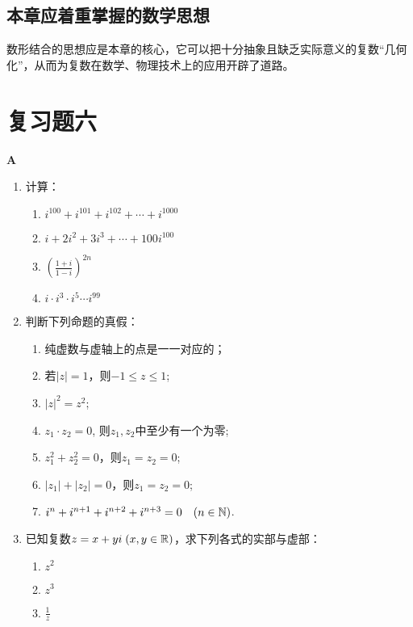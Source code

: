\subsection{本章应着重掌握的数学思想}
数形结合的思想应是本章的核心，它可以把十分抽象且缺乏实际意义的复数“几何化”，从而为复数在数学、物理技术上的应用开辟了道路。


\section*{复习题六}

\begin{center}
    \bfseries A
\end{center}

\begin{enumerate}
    \item 计算：
\begin{multicols}{2}
\begin{enumerate}[(1)]
    \item $i^{100}+i^{101}+i^{102}+\cdots +i^{1000}$
    \item $i+2i^2+3i^3+\cdots+100i^{100}$
    \item $\left(\frac{1+i}{1-i}\right)^{2n}$
    \item $i\cdot i^3\cdot i^5\cdots i^{99}$
\end{enumerate}
\end{multicols}

\item 判断下列命题的真假：
\begin{enumerate}[(1)]
\item 纯虚数与虚轴上的点是一一对应的；
\item 若$|z|=1$，则$-1\le z\le 1$;
\item $|z|^2=z^2$;
\item $z_1\cdot z_2=0$, 则$z_1,z_2$中至少有一个为零;
\item $z_1^2+z_2^2=0$，则$z_1=z_2=0$;
\item $|z_1|+|z_2|=0$，则$z_1=z_2=0$;
\item $i^n+i^{n+1}+i^{n+2}+i^{n+3}=0\quad (n\in\mathbb{N})$.
\end{enumerate}

\item 已知复数$z=x+yi\; (x,y\in\mathbb{R})$，求下列各式的实部与虚部：
\begin{multicols}{3}
\begin{enumerate}[(1)]
    \item $z^2$
    \item $z^3$
    \item $\frac{1}{z}$
\end{enumerate}
\end{multicols}


\end{enumerate}
